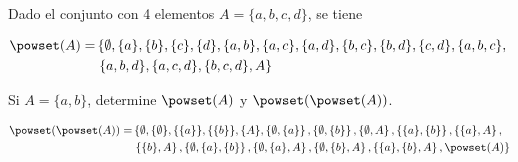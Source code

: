 \begin{example}
  Dado el conjunto con 4 elementos $A = \{a, b, c, d\}$, se tiene

  \begin{align*}
    \powset(A) =
    &\left\{ \emptyset, \{a\}, \{b\}, \{c\}, \{d\}, \{a, b\}, \{a, c\}, \{a,
      d\}, \{b, c\}, \{b, d\}, \{c, d\}, \{a, b, c\}, \right. \\
    &\left.\{a, b, d\}, \{a, c, d\}, \{b, c, d\}, A\right\} \\
  \end{align*}

  Si $A = \{a, b\}$, determine $\powset(A)$ y $\powset(\powset(A))$.

  \begin{align*}
    \powset(\powset(A)) =
    &\left\{
      \emptyset,
      \{\emptyset\},
      \{\{a\}\},
      \{\{b\}\},
      \{A\},
      \left\{\emptyset, \{a\}\right\},
      \left\{\emptyset, \{b\}\right\},
      \left\{\emptyset, A\right\},
      \left\{\{a\}, \{b\}\right\},
      \left\{\{a\}, A\right\},\right. \\
    &\left.\left\{\{b\}, A\right\},
      \left\{\emptyset, \{a\}, \{b\}\right\},
      \left\{\emptyset, \{a\}, A\right\},
      \left\{\emptyset, \{b\}, A\right\},
      \left\{\{a\}, \{b\}, A\right\},
      \powset(A)
    \right\} \\
  \end{align*}
\end{example}

